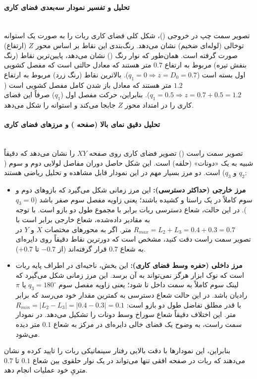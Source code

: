 \documentclass{article}
\begin{document}
\paragraph{تحلیل و تفسیر نمودار سه‌بعدی فضای کاری}\mbox{}\\
تصویر سمت چپ در خروجی ()، شکل کلی فضای کاری ربات را به صورت یک استوانه توخالی (لوله‌ای ضخیم) نشان می‌دهد. 
رنگ‌بندی این نقاط بر اساس محور $Z$ (ارتفاع) صورت گرفته است. همان‌طور که نوار رنگ () نشان می‌دهد، پایین‌ترین نقاط (رنگ بنفش تیره) مربوط به ارتفاع $0.7$ متر هستند که معادل حالتی است که مفصل کشویی اول بسته است ($q_1 = 0 \Rightarrow z = D_0 = 0.7$). بالاترین نقاط (رنگ زرد) مربوط به ارتفاع $1.2$ متر هستند که معادل باز شدن کامل مفصل کشویی است ($q_1 = 0.5 \Rightarrow z = 0.7 + 0.5 = 1.2$). بنابراین، حرکت مفصل اول ($q_1$) صرفاً این فضای کاری را در امتداد محور $Z$ جابجا می‌کند و استوانه را شکل می‌دهد.

\paragraph{تحلیل دقیق نمای بالا (صفحه ) و مرزهای فضای کاری}\mbox{}\\
تصویر سمت راست () تصویر فضای کاری روی صفحه $XY$ را نشان می‌دهد که دقیقاً شبیه به یک «دونات» (حلقه) است. این شکل حاصل دوران مفاصل لولایی دوم و سوم ($q_2$ و $q_3$) است.
دو مرز بسیار مهم در این نمودار قابل مشاهده و تحلیل ریاضی هستند:
\begin{itemize}
	\item \textbf{مرز خارجی (حداکثر دسترسی):} این مرز زمانی شکل می‌گیرد که بازوهای دوم و سوم کاملاً در یک راستا و کشیده باشند؛ یعنی زاویه مفصل سوم صفر باشد ($q_3 = 0$). در این حالت، شعاع دسترسی ربات برابر با مجموع طول دو بازو است. با توجه به مقادیر داده‌شده، شعاع خارجی برابر است با $R_{max} = L_2 + L_3 = 0.4 + 0.3 = 0.7$ متر. اگر به محورهای مختصات $X$ و $Y$ در تصویر سمت راست دقت کنید، مشخص است که دورترین نقاط دقیقاً روی دایره‌ای به شعاع $0.7$ قرار گرفته‌اند (از $-0.7$ تا $+0.7$).
	\item \textbf{مرز داخلی (حفره وسط فضای کاری):} این بخش، ناحیه‌ای در اطراف پایه ربات است که نوک ابزار هرگز نمی‌تواند به آن برسد. این مرز زمانی شکل می‌گیرد که لینک سوم کاملاً به سمت داخل تا شود؛ یعنی زاویه مفصل سوم $q_3 = 180^\circ$ یا $\pi$ رادیان باشد. در این حالت شعاع دسترسی به کمترین مقدار خود می‌رسد که برابر با قدر مطلق تفاضل طول دو بازو است: $R_{min} = |L_2 - L_3| = |0.4 - 0.3| = 0.1$ متر. این اختلاف دقیقاً شعاع سوراخ وسط دونات را تشکیل می‌دهد. در نمودار سمت راست، به وضوح یک فضای خالی دایره‌ای در مرکز به شعاع $0.1$ متر دیده می‌شود.
\end{itemize}
بنابراین، این نمودارها با دقت بالایی رفتار سینماتیکی ربات را تایید کرده و نشان می‌دهند که ربات در صفحه افقی تنها می‌تواند در یک نوار حلقوی بین شعاع $0.1$ تا $0.7$ متریِ خود عملیات انجام دهد.
\end{document}
